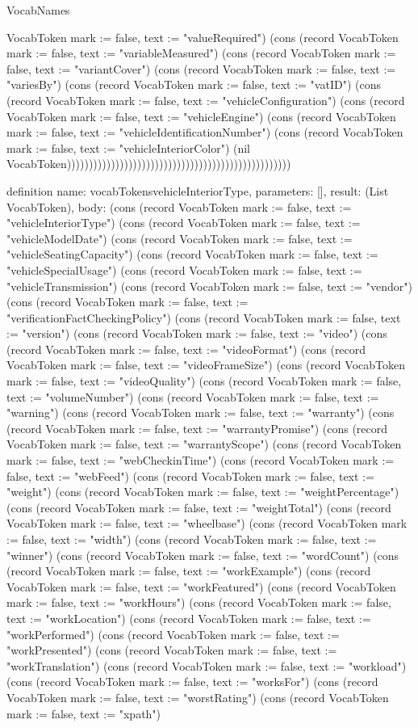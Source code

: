 \begin{lexlean}{VocabNames}
\begin{semanticmodule}
{VocabToken {mark := false, text := "valueRequired"}) (cons (record VocabToken {mark := false, text := "variableMeasured"}) (cons (record VocabToken {mark := false, text := "variantCover"}) (cons (record VocabToken {mark := false, text := "variesBy"}) (cons (record VocabToken {mark := false, text := "vatID"}) (cons (record VocabToken {mark := false, text := "vehicleConfiguration"}) (cons (record VocabToken {mark := false, text := "vehicleEngine"}) (cons (record VocabToken {mark := false, text := "vehicleIdentificationNumber"}) (cons (record VocabToken {mark := false, text := "vehicleInteriorColor"}) (nil VocabToken)))))))))))))))))))))))))))))))))))))))))))))))))))
}

definition{
  name: vocabTokensvehicleInteriorType,
  parameters: [],
  result: (List VocabToken),
  body: (cons (record VocabToken {mark := false, text := "vehicleInteriorType"}) (cons (record VocabToken {mark := false, text := "vehicleModelDate"}) (cons (record VocabToken {mark := false, text := "vehicleSeatingCapacity"}) (cons (record VocabToken {mark := false, text := "vehicleSpecialUsage"}) (cons (record VocabToken {mark := false, text := "vehicleTransmission"}) (cons (record VocabToken {mark := false, text := "vendor"}) (cons (record VocabToken {mark := false, text := "verificationFactCheckingPolicy"}) (cons (record VocabToken {mark := false, text := "version"}) (cons (record VocabToken {mark := false, text := "video"}) (cons (record VocabToken {mark := false, text := "videoFormat"}) (cons (record VocabToken {mark := false, text := "videoFrameSize"}) (cons (record VocabToken {mark := false, text := "videoQuality"}) (cons (record VocabToken {mark := false, text := "volumeNumber"}) (cons (record VocabToken {mark := false, text := "warning"}) (cons (record VocabToken {mark := false, text := "warranty"}) (cons (record VocabToken {mark := false, text := "warrantyPromise"}) (cons (record VocabToken {mark := false, text := "warrantyScope"}) (cons (record VocabToken {mark := false, text := "webCheckinTime"}) (cons (record VocabToken {mark := false, text := "webFeed"}) (cons (record VocabToken {mark := false, text := "weight"}) (cons (record VocabToken {mark := false, text := "weightPercentage"}) (cons (record VocabToken {mark := false, text := "weightTotal"}) (cons (record VocabToken {mark := false, text := "wheelbase"}) (cons (record VocabToken {mark := false, text := "width"}) (cons (record VocabToken {mark := false, text := "winner"}) (cons (record VocabToken {mark := false, text := "wordCount"}) (cons (record VocabToken {mark := false, text := "workExample"}) (cons (record VocabToken {mark := false, text := "workFeatured"}) (cons (record VocabToken {mark := false, text := "workHours"}) (cons (record VocabToken {mark := false, text := "workLocation"}) (cons (record VocabToken {mark := false, text := "workPerformed"}) (cons (record VocabToken {mark := false, text := "workPresented"}) (cons (record VocabToken {mark := false, text := "workTranslation"}) (cons (record VocabToken {mark := false, text := "workload"}) (cons (record VocabToken {mark := false, text := "worksFor"}) (cons (record VocabToken {mark := false, text := "worstRating"}) (cons (record VocabToken {mark := false, text := "xpath"}) }
\end{semanticmodule}
\end{lexlean}
